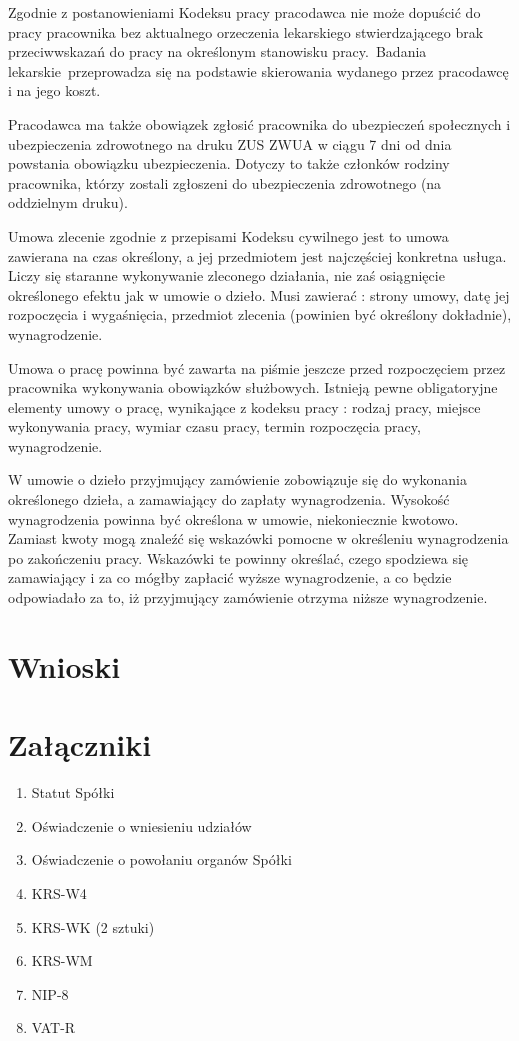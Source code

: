 \documentclass[11pt]{article}
\begin{document}
	Zgodnie z postanowieniami Kodeksu pracy pracodawca nie może dopuścić do pracy pracownika bez aktualnego orzeczenia lekarskiego stwierdzającego brak przeciwwskazań do pracy na określonym stanowisku pracy. Badania lekarskie przeprowadza się na podstawie skierowania wydanego przez pracodawcę i na jego koszt.
	
	
    Pracodawca ma także obowiązek zgłosić pracownika do ubezpieczeń społecznych i ubezpieczenia zdrowotnego na druku ZUS ZWUA w ciągu 7 dni od dnia powstania obowiązku ubezpieczenia. Dotyczy to także członków rodziny pracownika, którzy zostali zgłoszeni do ubezpieczenia zdrowotnego (na oddzielnym druku).
    
    Umowa zlecenie zgodnie z przepisami Kodeksu cywilnego jest to umowa zawierana na czas określony, a jej przedmiotem jest najczęściej konkretna usługa. Liczy się staranne wykonywanie zleconego działania, nie zaś osiągnięcie określonego efektu jak w umowie o dzieło. Musi zawierać : strony umowy, datę jej rozpoczęcia i wygaśnięcia, przedmiot zlecenia (powinien być określony dokładnie), wynagrodzenie.
    
   Umowa o pracę powinna być zawarta na piśmie jeszcze przed rozpoczęciem przez pracownika wykonywania obowiązków służbowych. Istnieją pewne obligatoryjne elementy umowy o pracę, wynikające z kodeksu pracy : rodzaj pracy, miejsce wykonywania pracy, wymiar czasu pracy, termin rozpoczęcia pracy, wynagrodzenie.
    
  W umowie o dzieło przyjmujący zamówienie zobowiązuje się do wykonania określonego dzieła, a zamawiający do zapłaty wynagrodzenia. Wysokość wynagrodzenia powinna być określona w umowie, niekoniecznie kwotowo. Zamiast kwoty mogą znaleźć się wskazówki pomocne w określeniu wynagrodzenia po zakończeniu pracy. Wskazówki te powinny określać, czego spodziewa się zamawiający i za co mógłby zapłacić wyższe wynagrodzenie, a co będzie odpowiadało za to, iż przyjmujący zamówienie otrzyma niższe wynagrodzenie.
  
	\section{Wnioski}
    
    \section{Załączniki}
    \begin{enumerate}
    	\item Statut Spółki
    	\item Oświadczenie o wniesieniu udziałów
    	\item Oświadczenie o powołaniu organów Spółki
    	\item KRS-W4
    	\item KRS-WK (2 sztuki)
    	\item KRS-WM
    	\item NIP-8
    	\item VAT-R
    \end{enumerate}
\end{document}
